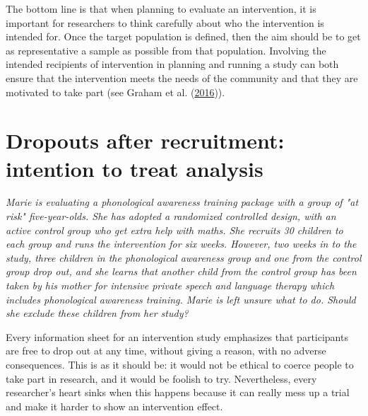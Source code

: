 \documentclass{krantz}
\begin{document}
The bottom line is that when planning to evaluate an intervention, it is important for researchers to think carefully about who the intervention is intended for. Once the target population is defined, then the aim should be to get as representative a sample as possible from that population. Involving the intended recipients of intervention in planning and running a study can both ensure that the intervention meets the needs of the community and that they are motivated to take part (see Graham et al. (\protect\hyperlink{ref-graham2016}{2016})).

\hypertarget{dropouts-after-recruitment-intention-to-treat-analysis}{%
\section{Dropouts after recruitment: intention to treat analysis}\label{dropouts-after-recruitment-intention-to-treat-analysis}}

\begin{shaded}
\textit{Marie is evaluating a phonological awareness training package with a group of "at risk" five-year-olds. She has adopted a randomized controlled design, with an active control group who get extra help with maths. She recruits 30 children to each group and runs the intervention for six weeks. However, two weeks in to the study, three children in the phonological awareness group and one from the control group drop out, and she learns that another child from the control group has been taken by his mother for intensive private speech and language therapy which includes phonological awareness training. Marie is left unsure what to do. Should she exclude these children from her study?}
\end{shaded}

Every information sheet for an intervention study emphasizes that participants are free to drop out at any time, without giving a reason, with no adverse consequences. This is as it should be: it would not be ethical to coerce people to take part in research, and it would be foolish to try. Nevertheless, every researcher's heart sinks when this happens because it can really mess up a trial and make it harder to show an intervention effect.
\end{document}
